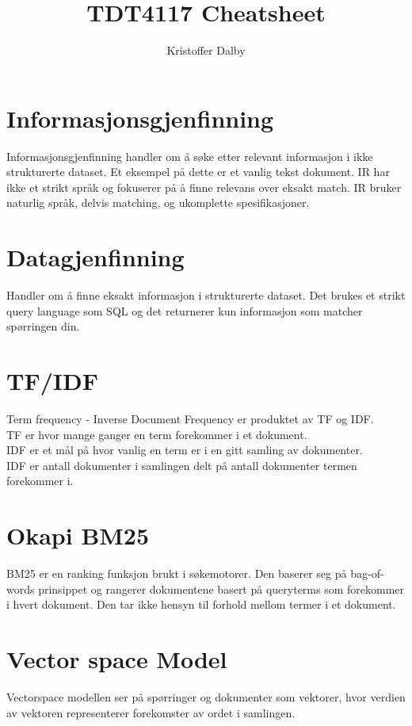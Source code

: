 \documentclass[a4paper, 10pt]{article}
\title{TDT4117 Cheatsheet}
\author{Kristoffer Dalby}
\date{}
\begin{document}
\maketitle

\thispagestyle{empty}
\newpage
{}
\setcounter{page}{1}

\section{Informasjonsgjenfinning}
Informasjonsgjenfinning handler om å søke etter relevant informasjon i ikke strukturerte dataset. Et eksempel på dette er et vanlig tekst dokument. IR har ikke et strikt språk og fokuserer på å finne relevans over eksakt match. IR bruker naturlig språk, delvis matching, og ukomplette spesifikasjoner.

\section{Datagjenfinning}
Handler om å finne eksakt informasjon i strukturerte dataset. Det brukes et strikt query language som SQL og det returnerer kun informasjon som matcher spørringen din.

\section{TF/IDF}
Term frequency - Inverse Document Frequency er produktet av TF og IDF.\\
TF er hvor mange ganger en term forekommer i et dokument.\\
IDF er et mål på hvor vanlig en term er i en gitt samling av dokumenter.\\
IDF er antall dokumenter i samlingen delt på antall dokumenter termen forekommer i.

\section{Okapi BM25}
BM25 er en ranking funksjon brukt i søkemotorer. Den baserer seg på bag-of-words prinsippet og rangerer dokumentene basert på queryterms som forekommer i hvert dokument. Den tar ikke hensyn til forhold mellom termer i et dokument.

\section{Vector space Model}
Vectorspace modellen ser på spørringer og dokumenter som vektorer, hvor verdien av vektoren representerer forekomster av ordet i samlingen.
\end{document}
